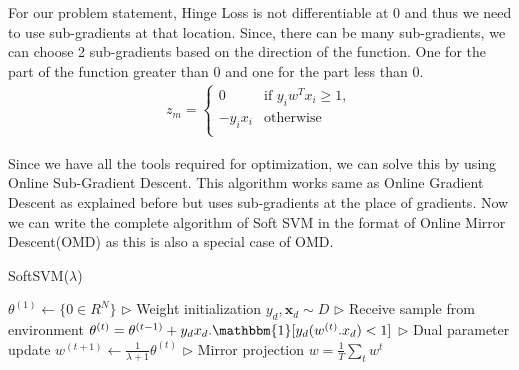 \documentclass[11pt]{article}
\begin{document}
{
}\\ \\
For our problem statement, Hinge Loss is not differentiable at 0 and thus we need to use sub-gradients at that location. Since, there can be many sub-gradients, we can choose 2 sub-gradients based on the direction of the function. One for the part of the function greater than 0 and one for the part less than 0. 
\begin{align}
    z_{m} = 
    \left\{
        \begin{array}{ll}
            0 & \mbox{if $y_{i}w^Tx_{i} \geq 1$},\\
            -y_{i}x_{i} & \mbox{otherwise}\\   
        \end{array}
    \right.
\end{align}

Since we have all the tools required for optimization, we can solve this by using Online Sub-Gradient Descent. This algorithm works same as Online Gradient Descent as explained before but uses sub-gradients at the place of gradients.
Now we can write the complete algorithm of Soft SVM in the format of Online Mirror Descent(OMD) as this is also a special case of OMD.


\begin{algorithm}[H]
\caption{SoftSVM(\(\lambda\))}
\label{algo:softsvm}
\begin{algorithmic}[1]
\STATE $\textbf{\(\theta\)}^{(1)} \leftarrow \{0 \in R^N\}$ \hfill $\triangleright$ Weight initialization
\STATE $y_{d}, \boldsymbol{x}_{d} \sim D$ \hfill $\triangleright$ Receive sample from environment
\STATE $\theta^{(t)} = \theta^{(t-1)} + y_{d}{x}_{d} . \mathbbm{1} [y_{d}(w^{(t)} . x_{d}) < 1] $ 
\hfill $\triangleright$ Dual parameter update
\STATE $w^{(t+1)} \leftarrow \frac{1}{\lambda+1} \theta^{(t)}$ \hfill $\triangleright$ Mirror projection
\ENDFOR
\STATE $w = \frac{1}{T}\sum_{t} w^{t} $
\end{algorithmic}
\end{algorithm}
\end{document}

